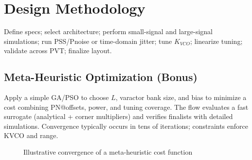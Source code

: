 \chapter{Design Methodology}
Define specs; select architecture; perform small-signal and large-signal simulations; run PSS/Pnoise or time-domain jitter; tune \(K_{VCO}\); linearize tuning; validate across PVT; finalize layout.

\section{Meta-Heuristic Optimization (Bonus)}
Apply a simple GA/PSO to choose \(L\), varactor bank size, and bias to minimize a cost combining PN@offsets, power, and tuning coverage. The flow evaluates a fast surrogate (analytical + corner multipliers) and verifies finalists with detailed simulations. Convergence typically occurs in tens of iterations; constraints enforce KVCO and range.

\begin{figure}[H]
  \centering
  \caption{Illustrative convergence of a meta-heuristic cost function}
\end{figure}


